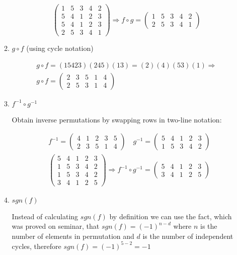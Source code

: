 \documentclass{article}
\begin{document}
\begin{enumerate}
\begin{enumerate}
\[
\begin{pmatrix}
1&5&3&4&2\\
5&4&1&2&3\\
\hline
5&4&1&2&3\\
2&5&3&4&1
\end{pmatrix}
\Rightarrow f \circ g = 
\begin{pmatrix}
1&5&3&4&2\\
2&5&3&4&1
\end{pmatrix}
\]

\item $g \circ f$ (using cycle notation)

\begin{align*}
g \circ f = (15423)(245)(13) = (2)(4)(53)(1) \Rightarrow\\
g \circ f = 
\begin{pmatrix}
2&3&5&1&4\\
2&5&3&1&4
\end{pmatrix}
\end{align*}

\item $f^{-1} \circ g^{-1}$

Obtain inverse permutations by swapping rows in two-line notation:

\begin{align*}
&f^{-1}=
\begin{pmatrix}
4&1&2&3&5\\
2&3&5&1&4
\end{pmatrix}
\quad g^{-1}=
\begin{pmatrix}
5&4&1&2&3\\
1&5&3&4&2
\end{pmatrix}\\
&\begin{pmatrix}
5&4&1&2&3\\
1&5&3&4&2\\
\hline
1&5&3&4&2\\
3&4&1&2&5
\end{pmatrix}
\Rightarrow f^{-1} \circ g^{-1} = 
\begin{pmatrix}
5&4&1&2&3\\
3&4&1&2&5
\end{pmatrix}
\end{align*}

\item $sgn(f)$

Instead of calculating $sgn(f)$ by definition we can use the fact, which was proved on seminar, that $sgn(f) = (-1)^{n-d}$ where $n$ is the number of elements in permutation and $d$ is the number of independent cycles, therefore $sgn(f) = (-1)^{5-2} = -1$


\end{enumerate}
\end{enumerate}
\end{document}
